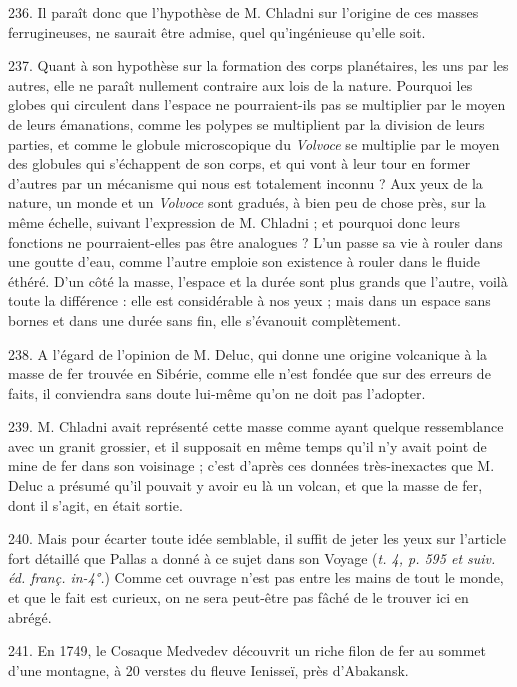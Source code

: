 \documentclass[a4paper, 11pt, oneside, polutonikogreek, french]{article}
\begin{document}
236. Il paraît donc que l'hypothèse de M. Chladni sur l'origine de ces masses ferrugineuses, ne saurait être admise, quel qu’ingénieuse qu'elle soit.

237. Quant à son hypothèse sur la formation des corps planétaires, les uns par les autres, elle ne paraît nullement contraire aux lois de la nature. Pourquoi les globes qui circulent dans l'espace ne pourraient-ils pas se multiplier par le moyen de leurs émanations, comme les polypes se multiplient par la division de leurs parties, et comme le globule microscopique du \emph{Volvoce} se multiplie par le moyen des globules qui s'échappent de son corps, et qui vont à leur tour en former d'autres par un mécanisme qui nous est totalement inconnu ? Aux yeux de la nature, un monde et un \emph{Volvoce} sont gradués, à bien peu de chose près, sur la même échelle, suivant l'expression de M. Chladni ; et pourquoi donc leurs fonctions ne pourraient-elles pas être analogues ? L'un passe sa vie à rouler dans une goutte d'eau, comme l'autre emploie son existence à rouler dans le fluide éthéré. D'un côté la masse, l'espace et la durée sont plus grands que l'autre, voilà toute la différence : elle est considérable à nos yeux ; mais dans un espace sans bornes et dans une durée sans fin, elle s'évanouit complètement.

238. A l'égard de l'opinion de M. Deluc, qui donne une origine volcanique à la masse de fer trouvée en Sibérie, comme elle n'est fondée que sur des erreurs de faits, il conviendra sans doute lui-même qu'on ne doit pas l'adopter.

239. M. Chladni avait représenté cette masse comme ayant quelque ressemblance avec un granit grossier, et il supposait en même temps qu'il n'y avait point de mine de fer dans son voisinage ; c'est d'après ces données très-inexactes que M. Deluc a présumé qu'il pouvait y avoir eu là un volcan, et que la masse de fer, dont il s'agit, en était sortie.

240. Mais pour écarter toute idée semblable, il suffit de jeter les yeux sur l'article fort détaillé que Pallas a donné à ce sujet dans son Voyage (\emph{t. 4, p. 595 et suiv. éd. franç. in-4°.}) Comme cet ouvrage n'est pas entre les mains de tout le monde, et que le fait est curieux, on ne sera peut-être pas fâché de le trouver ici en abrégé.

241. En 1749, le Cosaque Medvedev découvrit un riche filon de fer au sommet d'une montagne, à 20 verstes du fleuve Ienisseï, près d'Abakansk.
\end{document}
